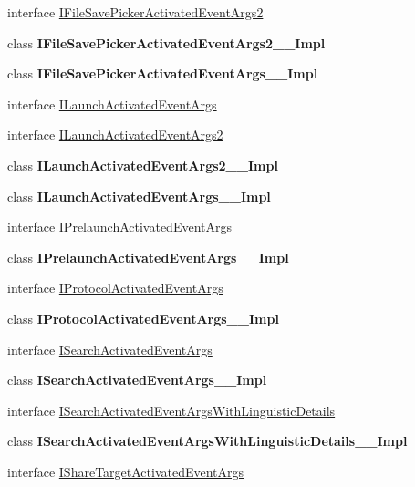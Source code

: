 \begin{DoxyCompactItemize}
\item 
interface \hyperlink{interface_windows_1_1_application_model_1_1_activation_1_1_i_file_save_picker_activated_event_args2}{I\+File\+Save\+Picker\+Activated\+Event\+Args2}
\item 
class {\bfseries I\+File\+Save\+Picker\+Activated\+Event\+Args2\+\_\+\+\_\+\+Impl}
\item 
class {\bfseries I\+File\+Save\+Picker\+Activated\+Event\+Args\+\_\+\+\_\+\+Impl}
\item 
interface \hyperlink{interface_windows_1_1_application_model_1_1_activation_1_1_i_launch_activated_event_args}{I\+Launch\+Activated\+Event\+Args}
\item 
interface \hyperlink{interface_windows_1_1_application_model_1_1_activation_1_1_i_launch_activated_event_args2}{I\+Launch\+Activated\+Event\+Args2}
\item 
class {\bfseries I\+Launch\+Activated\+Event\+Args2\+\_\+\+\_\+\+Impl}
\item 
class {\bfseries I\+Launch\+Activated\+Event\+Args\+\_\+\+\_\+\+Impl}
\item 
interface \hyperlink{interface_windows_1_1_application_model_1_1_activation_1_1_i_prelaunch_activated_event_args}{I\+Prelaunch\+Activated\+Event\+Args}
\item 
class {\bfseries I\+Prelaunch\+Activated\+Event\+Args\+\_\+\+\_\+\+Impl}
\item 
interface \hyperlink{interface_windows_1_1_application_model_1_1_activation_1_1_i_protocol_activated_event_args}{I\+Protocol\+Activated\+Event\+Args}
\item 
class {\bfseries I\+Protocol\+Activated\+Event\+Args\+\_\+\+\_\+\+Impl}
\item 
interface \hyperlink{interface_windows_1_1_application_model_1_1_activation_1_1_i_search_activated_event_args}{I\+Search\+Activated\+Event\+Args}
\item 
class {\bfseries I\+Search\+Activated\+Event\+Args\+\_\+\+\_\+\+Impl}
\item 
interface \hyperlink{interface_windows_1_1_application_model_1_1_activation_1_1_i_search_activated_event_args_with_linguistic_details}{I\+Search\+Activated\+Event\+Args\+With\+Linguistic\+Details}
\item 
class {\bfseries I\+Search\+Activated\+Event\+Args\+With\+Linguistic\+Details\+\_\+\+\_\+\+Impl}
\item 
interface \hyperlink{interface_windows_1_1_application_model_1_1_activation_1_1_i_share_target_activated_event_args}{I\+Share\+Target\+Activated\+Event\+Args}

\end{DoxyCompactItemize}
